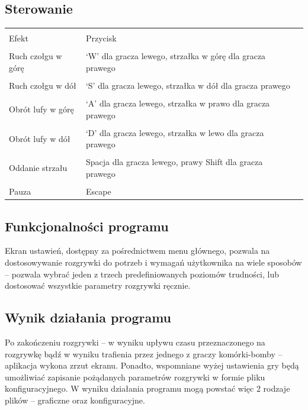 \documentclass[11pt,a4paper]{report}
\begin{document}
\subsection {Sterowanie}
\begin{tabularx}{\textwidth}{  X|Xl  }
 \hline
 \\Efekt                                   					& Przycisk\\
 \hline \hline
			\\Ruch czołgu w górę			&‘W’ dla gracza lewego, strzałka w górę dla gracza prawego\\
 \hline
			\\Ruch czołgu w dół				&‘S’ dla gracza lewego, strzałka w dół dla gracza prawego\\
 \hline
			\\Obrót lufy w górę				&‘A’ dla gracza lewego, strzałka w prawo dla gracza prawego\\
\hline
			\\Obrót lufy w dół				&‘D’ dla gracza lewego, strzałka w lewo dla gracza prawego\\
 \hline
			\\Oddanie strzału				&Spacja dla gracza lewego, prawy Shift dla gracza prawego\\
 \hline
			\\Pauza					&Escape\\
 \hline
\end{tabularx}

\subsection {Funkcjonalności programu}
Ekran ustawień, dostępny za pośrednictwem menu głównego, pozwala na dostosowywanie rozgrywki do potrzeb i wymagań użytkownika na wiele sposobów -- pozwala wybrać jeden z trzech predefiniowanych poziomów trudności, lub dostosować wszystkie parametry rozgrywki ręcznie.

\subsection {Wynik działania programu}
Po zakończeniu rozgrywki -- w wyniku upływu czasu przeznaczonego na rozgrywkę bądź w wyniku trafienia przez jednego z graczy komórki-bomby -- aplikacja wykona zrzut ekranu. Ponadto, wspomniane wyżej ustawienia gry będą umożliwiać zapisanie pożądanych parametrów rozgrywki w formie pliku konfiguracyjnego. W wyniku działania programu mogą powstać więc 2 rodzaje plików -- graficzne oraz konfiguracyjne.
\end{document}
